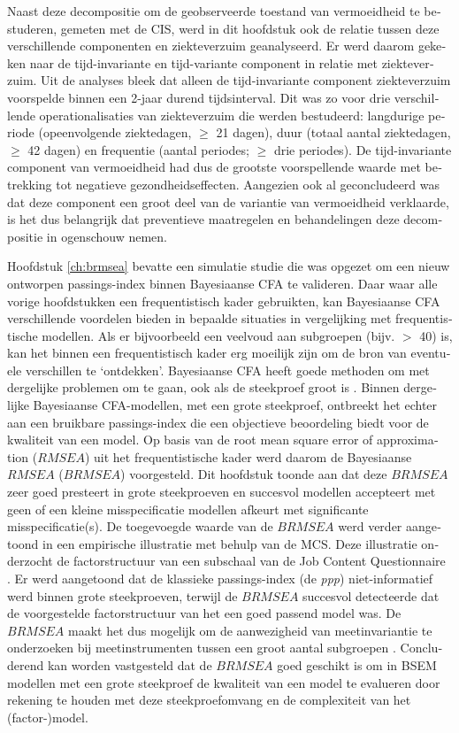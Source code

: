 \begin{otherlanguage}{dutch}
Naast deze decompositie om de geobserveerde toestand van vermoeidheid te bestuderen, gemeten met de CIS, werd in dit hoofdstuk ook de relatie tussen deze verschillende componenten en ziekteverzuim geanalyseerd. Er werd daarom gekeken naar de tijd-invariante en tijd-variante component in relatie met ziekteverzuim. Uit de analyses bleek dat alleen de tijd-invariante component ziekteverzuim voorspelde binnen een 2-jaar durend tijdsinterval. Dit was zo voor drie verschillende operationalisaties van ziekteverzuim die werden bestudeerd: langdurige periode (opeenvolgende ziektedagen, $\geq$ 21 dagen), duur (totaal aantal ziektedagen, $\geq$ 42 dagen) en frequentie (aantal periodes; $\geq$ drie periodes). De tijd-invariante component van vermoeidheid had dus de grootste voorspellende waarde met betrekking tot negatieve gezondheidseffecten. Aangezien ook al geconcludeerd was dat deze component een groot deel van de variantie van vermoeidheid verklaarde, is het dus belangrijk dat preventieve maatregelen en behandelingen deze decompositie in ogenschouw nemen. 

Hoofdstuk \ref{ch:brmsea} bevatte een simulatie studie die was opgezet om een nieuw ontworpen passings-index binnen Bayesiaanse CFA te valideren. Daar waar alle vorige hoofdstukken een frequentistisch kader gebruikten, kan Bayesiaanse CFA verschillende voordelen bieden in bepaalde situaties in vergelijking met frequentistische modellen. Als er bijvoorbeeld een veelvoud aan subgroepen (bijv. $>$ 40) is, kan het binnen een frequentistisch kader erg moeilijk zijn om de bron van eventuele verschillen te `ontdekken'. Bayesiaanse CFA heeft goede methoden om met dergelijke problemen om te gaan, ook als de steekproef groot is \parencite{Schoot_2014}. Binnen dergelijke Bayesiaanse CFA-modellen, met een grote steekproef, ontbreekt het echter aan een bruikbare passings-index die een objectieve beoordeling biedt voor de kwaliteit van een model. Op basis van de root mean square error of approximation ($RMSEA$) uit het frequentistische kader werd daarom de Bayesiaanse $RMSEA$ ($BRMSEA$) voorgesteld. Dit hoofdstuk toonde aan dat deze $BRMSEA$ zeer goed presteert in grote steekproeven en succesvol modellen accepteert met geen of een kleine misspecificatie  modellen afkeurt met significante misspecificatie(s). De toegevoegde waarde van de $BRMSEA$ werd verder aangetoond in een empirische illustratie met behulp van de MCS. Deze illustratie onderzocht de factorstructuur van een subschaal van de Job Content Questionnaire \parencite{Karasek_1985}. Er werd aangetoond dat de klassieke passings-index (de \textit{ppp}) niet-informatief werd binnen grote steekproeven, terwijl de $BRMSEA$ succesvol detecteerde dat de voorgestelde factorstructuur van het een goed passend model was. De $BRMSEA$ maakt het dus mogelijk om de aanwezigheid van meetinvariantie te onderzoeken bij meetinstrumenten tussen een groot aantal subgroepen \parencite{Schoot_2013a}. Concluderend kan worden vastgesteld dat de $BRMSEA$ goed geschikt is om in BSEM modellen met een grote steekproef de kwaliteit van een model te evalueren door rekening te houden met deze steekproefomvang en de complexiteit van het (factor-)model.


\end{otherlanguage}
